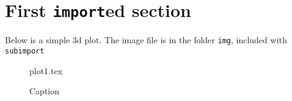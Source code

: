 \section{First \texttt{import}ed section}

Below is a simple 3d plot. The image file is in the folder \texttt{img}, included with \texttt{subimport}

\begin{figure}[h]
\centering
{plot1.tex}
\caption{Caption}
\label{fig:my_label}
\end{figure}


\Blindtext
